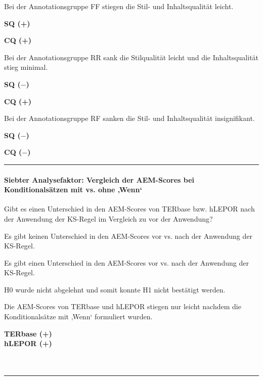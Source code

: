 \medskip
\noindent
\parbox[t]{.8\textwidth}{
Bei der Annotationsgruppe FF stiegen die Stil- und Inhaltsqualität leicht.
}
\parbox[t]{.04\textwidth}{}
\parbox[t]{.15\textwidth}{
\textbf{SQ (+)}

 \textbf{CQ (+)}
}

\medskip
\noindent
\parbox[t]{.8\textwidth}{
Bei der Annotationsgruppe RR sank die Stilqualität leicht und die Inhaltsqualität stieg minimal.
}
\parbox[t]{.04\textwidth}{}
\parbox[t]{.15\textwidth}{
\textbf{SQ ($-$)}

 \textbf{CQ (+)}
}

\medskip
\noindent
\parbox[t]{.8\textwidth}{
Bei der Annotationsgruppe RF sanken die Stil- und Inhaltsqualität insignifikant.
}
\parbox[t]{.04\textwidth}{}
\parbox[t]{.15\textwidth}{
\textbf{SQ ($-$)}

 \textbf{CQ ($-$)}
 }

\hrule
\paragraph*{Siebter Analysefaktor: Vergleich der AEM-Scores bei Konditionalsätzen mit vs. ohne ‚Wenn‘}
\begin{description}[font=\normalfont\bfseries]
\item [Fragestellung:] Gibt es einen Unterschied in den AEM-Scores von TERbase bzw. hLEPOR nach der Anwendung der KS-Regel im Vergleich zu vor der Anwendung?
\item [H0 --] Es gibt keinen Unterschied in den AEM-Scores vor vs. nach der Anwendung der KS-Regel.
\item [H1 --] Es gibt einen Unterschied in den AEM-Scores vor vs. nach der Anwendung der KS-Regel.
\item [Resultat]
\end{description}
\noindent
\parbox[t]{.75\textwidth}{
H0 wurde nicht abgelehnt und somit konnte H1 nicht bestätigt werden.

Die AEM-Scores von TERbase und hLEPOR stiegen nur leicht nachdem die Konditionalsätze mit ‚Wenn‘ formuliert wurden.
}
\parbox[t]{.04\textwidth}{}
\parbox[t]{.2\textwidth}{
\textbf{TERbase (+)\\hLEPOR (+)}\\
\\
\\
}

\smallskip
\hrule
